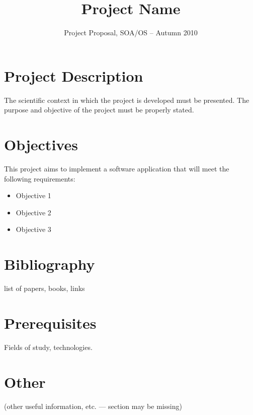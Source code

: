 \documentclass{propsoa.cs.pub.ro}
\title{Project Name}
\subtitle{Project Proposal, SOA/OS -- Autumn 2010}
\begin{document}
\maketitle

\section{Project Description}

The scientific context in which the project is developed must be presented.
The purpose and objective of the project must be properly stated.

\section{Objectives}

This project aims to implement a software application that will meet the
following requirements:
\begin{itemize}
	\item{Objective 1}
	\item{Objective 2}
	\item{Objective 3}
\end{itemize}

\section{Bibliography}

list of papers, books, links

\section{Prerequisites}

Fields of study, technologies.

\section{Other}

(other useful information, etc. --- section may be missing)
\end{document}
